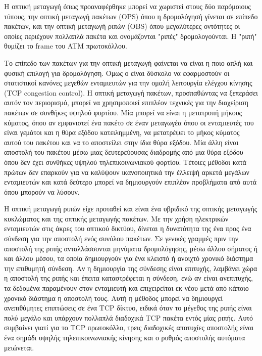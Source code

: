 Η οπτική μεταγωγή όπως προαναφέρθηκε μπορεί να χωριστεί στους δύο
παρόμοιους τύπους, την οπτική μεταγωγή πακέτων (OPS) όπου η
δρομολόγησή γίνεται σε επίπεδο πακέτων, και την οπτική μεταγωγή ριπών
(OBS) όπου μεγαλύτερες οντότητες οι οποίες περιέχουν πολλαπλά πακέτα
και ονομάζονται "ριπές" δρομολογούνται. Η "ριπή" θυμίζει το frame του
ATM πρωτοκόλλου.

Το επίπεδο των πακέτων για την οπτική μεταγωγή φαίνεται να είναι η
ποιο απλή και φυσική επιλογή για δρομολόγηση. Όμως ο είναι δύσκολο να
εφαρμοστούν οι στατιστικοί κανόνες μεγεθών ενταμιευτών για την ομαλή
λειτουργία ελέγχου κίνησης (TCP congestion control). Η οπτική μεταγωγή
πακέτων, προσπαθώντας να ξεπεράσει αυτόν τον περιορισμό, μπορεί να
χρησιμοποιεί επιπλέον τεχνικές για την διαχείριση πακέτων σε συνθήκες
υψηλού φορτίου. Μία μπορεί να είναι η μετατροπή μήκους κύματος, όπου
αν εμφανιστεί ένα πακέτο σε έναν μεταγωγέα όπου οι ενταμιευτές του
είναι γεμάτοι και η θύρα εξόδου κατειλημμένη, να μετατρέψει το μήκος
κύματος αυτού του πακέτου και να το αποστείλει στην ίδια θύρα
εξόδου. Μία άλλη είναι αποστολή του πακέτου μέσω μιας δευτερεύουσας
διαδρομής από μια θύρα εξόδου όπου δεν έχει συνθήκες υψηλού
τηλεπικοινωνιακού φορτίου. Τέτοιες μέθοδοι κατά πρώτων δεν επαρκούν
για να καλύψουν ικανοποιητικά την έλλειψή αρκετά μεγάλων ενταμιευτών
και κατά δεύτερο μπορεί να δημιουργούν επιπλέον προβλήματα από αυτά
όπου μπορούν να λύσουν.

Η οπτική μεταγωγή ριπών είχε προταθεί και είναι ένα υβριδικό της
οπτικής μεταγωγής κυκλώματος και της οπτικής μεταγωγής πακέτων. Με την
χρήση ηλεκτρικών ενταμιευτών στις άκρες του οπτικού δικτύου, δίνεται η
δυνατότητα της ένα προς ένα σύνδεση για την αποστολή ενός συνόλου
πακέτων. Σε γενικές γραμμές πριν την αποστολή της ριπής ανταλλάσσονται
μηνύματα δρομολόγησης, μέσω άλλου σήματος ή και άλλου μέσου, τα οποία
δημιουργούν για ένα κλειστό ή ανοιχτό χρονικό διάστημα την επιθυμητή
σύνδεση. Αν η δημιουργία της σύνδεσης είναι επιτυχής, λαμβάνει χώρα η
αποστολή της ριπής και έπειτα καταστρέφεται η σύνδεση, ενώ αν είναι
ανεπιτυχής, τα δεδομένα παραμένουν στον ενταμιευτή και επιχειρείται εκ
νέου μετά από κάποιο χρονικό διάστημα η αποστολή τους. Αυτή η μέθοδος
μπορεί να δημιουργεί ανεπιθύμητες επιπτώσεις σε ένα TCP δίκτυο, ειδικά
όταν το μέγεθος της ριπής είναι πολύ μεγάλο και υπάρχουν πολλαπλά
διαδοχικά TCP πακέτα εντός μίας ριπής. Αυτό συμβαίνει γιατί για το TCP
πρωτοκόλλο, τρεις διαδοχικές αποτυχίες αποστολής είναι ένα σημάδι
υψηλής τηλεπικοινωνιακής κίνησης και ο ρυθμός αποστολής αυτόματα
μειώνεται.

